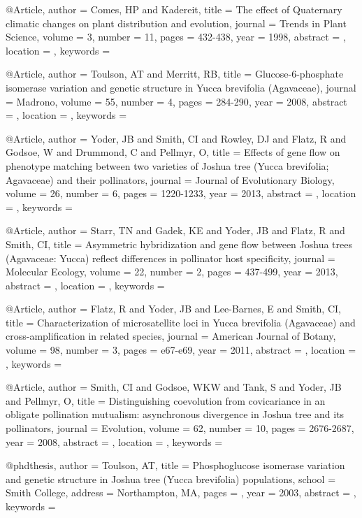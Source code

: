 @Article{,
author = {Comes, HP and Kadereit}, 
title = {The effect of Quaternary climatic changes on plant distribution and evolution}, 
journal = {Trends in Plant Science}, 
volume = {3}, 
number = {11}, 
pages = {432-438}, 
year = {1998}, 
abstract = {}, 
location = {}, 
keywords = {}}


@Article{,
author = {Toulson, AT and Merritt, RB}, 
title = {Glucose-6-phosphate isomerase variation and genetic structure in Yucca brevifolia (Agavaceae)}, 
journal = {Madrono}, 
volume = {55}, 
number = {4}, 
pages = {284-290}, 
year = {2008}, 
abstract = {}, 
location = {}, 
keywords = {}}


@Article{,
author = {Yoder, JB and Smith, CI and Rowley, DJ and Flatz, R and Godsoe, W and Drummond, C and Pellmyr, O}, 
title = {Effects of gene flow on phenotype matching between two varieties of Joshua tree (Yucca brevifolia; Agavaceae) and their pollinators}, 
journal = {Journal of Evolutionary Biology}, 
volume = {26}, 
number = {6}, 
pages = {1220-1233}, 
year = {2013}, 
abstract = {}, 
location = {}, 
keywords = {}}


@Article{,
author = {Starr, TN and Gadek, KE and Yoder, JB and Flatz, R and Smith, CI}, 
title = {Asymmetric hybridization and gene flow between Joshua trees (Agavaceae: Yucca) reflect differences in pollinator host specificity}, 
journal = {Molecular Ecology}, 
volume = {22}, 
number = {2}, 
pages = {437-499}, 
year = {2013}, 
abstract = {}, 
location = {}, 
keywords = {}}


@Article{,
author = {Flatz, R and Yoder, JB and Lee-Barnes, E and Smith, CI}, 
title = {Characterization of microsatellite loci in Yucca brevifolia (Agavaceae) and cross-amplification in related species}, 
journal = {American Journal of Botany}, 
volume = {98}, 
number = {3}, 
pages = {e67-e69}, 
year = {2011}, 
abstract = {}, 
location = {}, 
keywords = {}}


@Article{,
author = {Smith, CI and Godsoe, WKW and Tank, S and Yoder, JB and Pellmyr, O}, 
title = {Distinguishing coevolution from covicariance in an obligate pollination mutualism: asynchronous divergence in Joshua tree and its pollinators}, 
journal = {Evolution}, 
volume = {62}, 
number = {10}, 
pages = {2676-2687}, 
year = {2008}, 
abstract = {}, 
location = {}, 
keywords = {}}


@phdthesis{,
author = {Toulson, AT}, 
title = {Phosphoglucose isomerase variation and genetic structure in Joshua tree (Yucca brevifolia) populations}, 
school = {Smith College}, 
address = {Northampton, MA}, 
pages = {}, 
year = {2003}, 
abstract = {}, 
keywords = {}}

